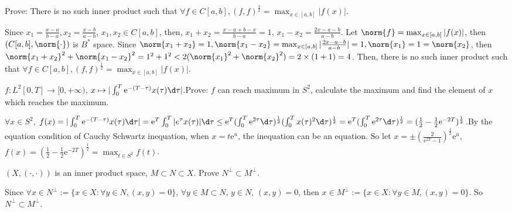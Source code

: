 \documentclass{ctexart}
\newif\ifpreface
\begin{document}
\large
\setlength{\baselineskip}{1.2em}
\ifpreface
    
\else
\maketitle
\fi
{}
\begin{problem}
    Prove: There is no such inner product such that $\forall f\in C[a,b], (f,f)^{\frac{1}{2}}= \max_{x\in[a,b]} |f(x)|$.
\end{problem}

\begin{solution}
    Since $x_1=\frac{x-a}{b-a},x_2=\frac{x-b}{a-b}$, $x_1,x_2\in C[a,b]$, then, $x_1+x_2=\frac{x-a+b-x}{b-a}=1$, $x_1-x_2=\frac{2x-a-b}{a-b}$. Let $\norm{f}=\max_{x\in[a,b]} |f(x)|$, then $(C[a,b],\norm{\cdot})$ is $B^*$ space. Since $\norm{x_1+x_2}=1,\norm{x_1-x_2}=\max_{x\in[a,b]} |\frac{2x-a-b}{a-b}|=1,\norm{x_1}=1=\norm{x_2}$, then $\norm{x_1+x_2}^2+\norm{x_1-x_2}^2=1^2+1^2<2(\norm{x_1}^2+\norm{x_2}^2)=2\times (1+1)=4$. Then, there is no such inner product such that $\forall f\in C[a,b], (f,f)^{\frac{1}{2}}= \max_{x\in[a,b]} |f(x)|$.
\end{solution}

\begin{problem}
    $f:L^2[0,T]\to[0,+\infty)$, $x\mapsto |\int_0^T \mathrm{e}^{-(T-\tau)}x(\tau)\d \tau|$.Prove: $f$ can reach maximum in $S^2$, calculate the maximum and find the element of $x$ which reaches the maximum.
\end{problem}
\begin{solution}
    $\forall x\in S^2$, $f(x)=|\int_0^T \mathrm{e}^{-(T-\tau)}x(\tau)\d \tau|=\mathrm{e}^T\int_0^T|e^\tau x(\tau)|\d \tau\leq \mathrm{e}^T(\int_0^T \mathrm{e}^{2\tau}\d \tau)^{\frac{1}{2}}(\int_0^T x(\tau)^2\d \tau)^{\frac{1}{2}}=\mathrm{e}^T(\int_0^T \mathrm{e}^{2\tau}\d \tau)^{\frac{1}{2}}=(\frac{1}{2}-\frac{1}{2}\mathrm{e}^{-2T})^{\frac{1}{2}}$.By the equation condition of Cauchy Schwartz inequation, when $x=t \mathrm{e}^u$, the inequation can be an equation. So let $x=\pm(\frac{2}{\mathrm{e}^{2T}-1})^\frac{1}{2}\mathrm{e}^u$, $f(x)=(\frac{1}{2}-\frac{1}{2}\mathrm{e}^{-2T})^{\frac{1}{2}}=\max_{t\in S^2}f(t)$.
\end{solution}

\begin{problem}
    $(X,(\cdot,\cdot))$ is an inner product space, $M\subset N\subset X$. Prove $N^{\perp}\subset M^{\perp}$. 
\end{problem}
\begin{solution}
    Since $\forall x\in N^{\perp}:=\{x\in X:\forall y\in N, (x,y)=0\}$, $\forall y\in M\subset N$, $y\in N$, $(x,y)=0$, then $x\in M^{\perp}:=\{x\in X:\forall y\in M, (x,y)=0\}$. So $N^{\perp}\subset M^{\perp}$.
\end{solution}
\end{document}

